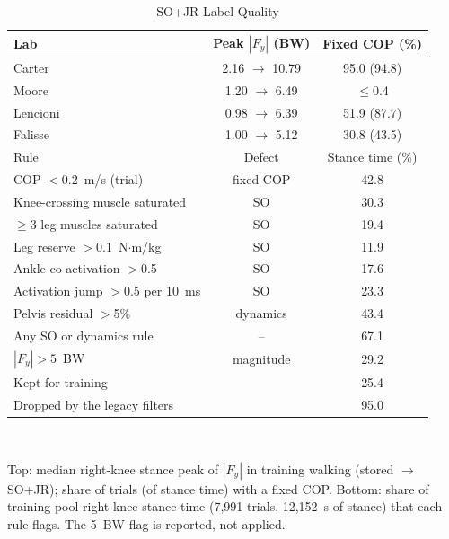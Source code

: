 \begin{table}[t]
\caption{SO+JR Label Quality}
\label{tab:qc}
\centering\footnotesize
\setlength{\tabcolsep}{3pt}
\begin{tabular}{@{}lcc@{}}
\toprule
Lab & Peak $|F_y|$ (BW) & Fixed COP (\%)\\
\midrule
Carter   & 2.16 $\to$ 10.79 & 95.0 (94.8)\\
Moore    & 1.20 $\to$ 6.49  & $\le$0.4\\
Lencioni & 0.98 $\to$ 6.39  & 51.9 (87.7)\\
Falisse  & 1.00 $\to$ 5.12  & 30.8 (43.5)\\
\midrule
Rule & Defect & Stance time (\%)\\
\midrule
COP $<$0.2~m/s (trial)                & fixed COP & 42.8\\
Knee-crossing muscle saturated        & SO        & 30.3\\
$\ge$3 leg muscles saturated          & SO        & 19.4\\
Leg reserve $>$0.1~N$\cdot$m/kg       & SO        & 11.9\\
Ankle co-activation $>$0.5            & SO        & 17.6\\
Activation jump $>$0.5 per 10~ms      & SO        & 23.3\\
Pelvis residual $>$5\%                & dynamics  & 43.4\\
Any SO or dynamics rule               & --        & 67.1\\
$|F_y| > 5$~BW                        & magnitude & 29.2\\
\midrule
Kept for training                     &           & 25.4\\
Dropped by the legacy filters         &           & 95.0\\
\bottomrule
\end{tabular}\\[2pt]
\parbox{\columnwidth}{\scriptsize Top: median right-knee stance peak of $|F_y|$ in training
walking (stored $\to$ SO+JR); share of trials (of stance time) with a fixed COP. Bottom: share of
training-pool right-knee stance time (7,991 trials, 12,152~s of stance) that each rule flags. The
5~BW flag is reported, not applied.}
\end{table}

